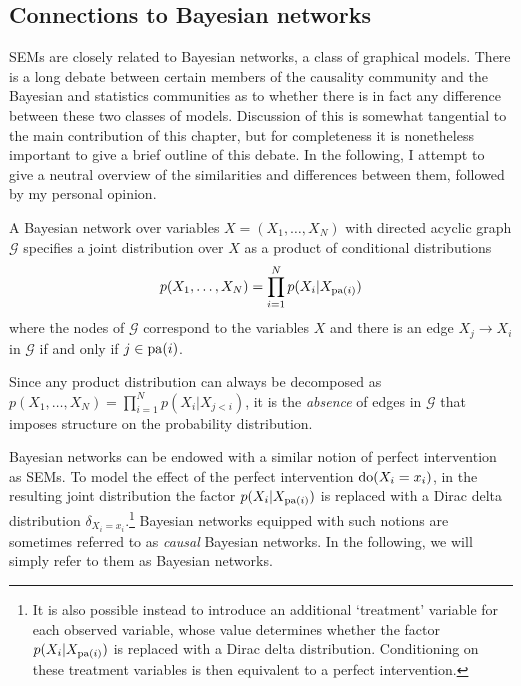 \subsection{Connections to Bayesian networks}

SEMs are closely related to Bayesian networks, a class of graphical models.
There is a long debate between certain members of the causality community and the Bayesian and statistics communities as to whether there is in fact any difference between these two classes of models.
Discussion of this is somewhat tangential to the main contribution of this chapter, but for completeness it is nonetheless important to give a brief outline of this debate.
In the following, I attempt to give a neutral overview of the similarities and differences between them, followed by my personal opinion.


\medskip

\begin{definition}
A Bayesian network over variables $X = (X_1,\ldots, X_N)$ with directed acyclic graph $\mathcal{G}$ specifies a joint distribution over $X$ as a product of conditional distributions
\begin{align*}
	p(X_1,\ldots,X_N) = \prod_{i=1}^N p(X_i | X_{\operatorname{pa}(i)})
\end{align*}
where the nodes of $\mathcal{G}$ correspond to the variables $X$ and there is an edge $X_j \to X_i$ in $\mathcal{G}$ if and only if $j \in \operatorname{pa}(i)$.
\end{definition}

Since any product distribution can always be decomposed as $p(X_1,\ldots,X_N) = \prod_{i=1}^N p(X_i | X_{j<i})$, it is the \emph{absence} of edges in $\mathcal{G}$ that imposes structure on the probability distribution.

Bayesian networks can be endowed with a similar notion of perfect intervention as SEMs. To model the effect of the perfect intervention $\operatorname{do}(X_i = x_i)$, in the resulting joint distribution the factor $p(X_i | X_{\operatorname{pa}(i)})$ is replaced with a Dirac delta distribution $\delta_{X_i = x_i}$.\footnote{It is also possible instead to introduce an additional `treatment' variable for each observed variable, whose value determines whether the factor $p(X_i | X_{\operatorname{pa}(i)})$ is replaced with a Dirac delta distribution.
Conditioning on these treatment variables is then equivalent to a perfect intervention.}
Bayesian networks equipped with such notions are sometimes referred to as \emph{causal} Bayesian networks. 
In the following, we will simply refer to them as Bayesian networks.


